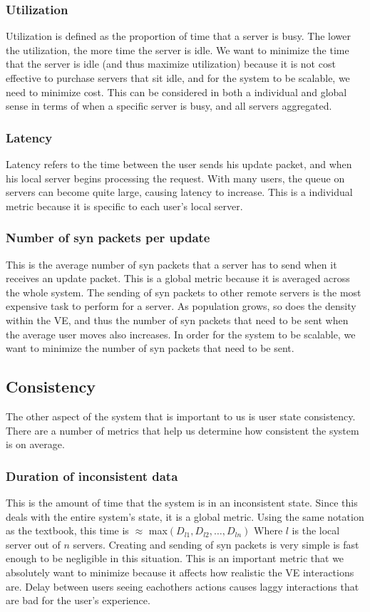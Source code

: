 \documentclass[12pt]{article}
\begin{document}
    \subsubsection{Utilization}
Utilization is defined as the proportion of time that a server is busy.  The
lower the utilization, the more time the server is idle.  We want to minimize
the time that the server is idle (and thus maximize utilization) because it is
not cost effective to purchase servers that sit idle, and for the system to be
scalable, we need to minimize cost.  This can be considered in both a individual
and global sense in terms of when a specific server is busy, and all servers
aggregated.
    \subsubsection{Latency}
Latency refers to the time between the user sends his update packet, and when
his local server begins processing the request.  With many users, the queue on
servers can become quite large, causing latency to increase.  This is a
individual metric because it is specific to each user's local server.
    \subsubsection{Number of syn packets per update}
This is the average number of syn packets that a server has to send when it
receives an update packet.  This is a global metric because it is averaged
across the whole system.
The sending of syn packets to other remote servers is the most expensive task to
perform for a server.  As population grows, so does the density within the VE,
and thus the number of syn packets that need to be sent when the average user
moves also increases.  In order for the system to be scalable, we want to
minimize the number of syn packets that need to be sent.
  \subsection{Consistency}
The other aspect of the system that is important to us is user state
consistency.  There are a number of metrics that help us determine how
consistent the system is on average.
    \subsubsection{Duration of inconsistent data}
This is the amount of time that the system is in an inconsistent state.  Since
this deals with the entire system's state, it is a global metric.  Using
the same notation as the textbook, this time is $\approx $ max$(D_{l1}, D_{l2},
\dots, D_{ln})$  Where $l$ is the local server out of $n$ servers.  Creating and
sending of syn packets is very simple is fast enough to be negligible in this
situation.
This is an important metric that we absolutely want to minimize because it
affects how realistic the VE interactions are.  Delay between users seeing
eachothers actions causes laggy interactions that are bad for the user's
experience.
\end{document}
